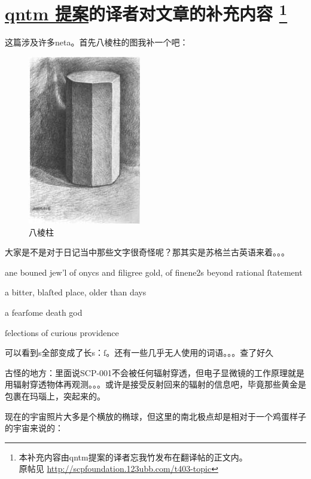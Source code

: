 \chapter[qntm 提案的译者对文章的补充内容]{
	\hyperref[chap:SCP.001.the.lock]{qntm 提案}的译者对文章的补充内容
	\protect\footnote{
		本补充内容由qntm提案的译者忘我竹发布在翻译帖的正文内。 \\
		原帖见 \url{http://scpfoundation.123ubb.com/t403-topic}
	}
}

\label{chap:qntm.translator.append}

这篇涉及许多neta。首先八棱柱的图我补一个吧：

\begin{figure}[H]
	\centering
	\includegraphics{images/appendix.2.1.jpg}
	\caption{八棱柱}
\end{figure}

大家是不是对于日记当中那些文字很奇怪呢？那其实是苏格兰古英语来着。。。

ane bouned jew'l of onycs and filigree gold, of finene2s beyond rational ſtatement

a bitter, blaſted place, older than days

a fearſome death god

ſelections of curious providence

可以看到s全部变成了长s：ſ。还有一些几乎无人使用的词语。。。查了好久

古怪的地方：里面说SCP-001不会被任何辐射穿透，但电子显微镜的工作原理就是用辐射穿透物体再观测。。。或许是接受反射回来的辐射的信息吧，毕竟那些黄金是包裹在玛瑙上，突起来的。

现在的宇宙照片大多是个横放的椭球，但这里的南北极点却是相对于一个鸡蛋样子的宇宙来说的：

